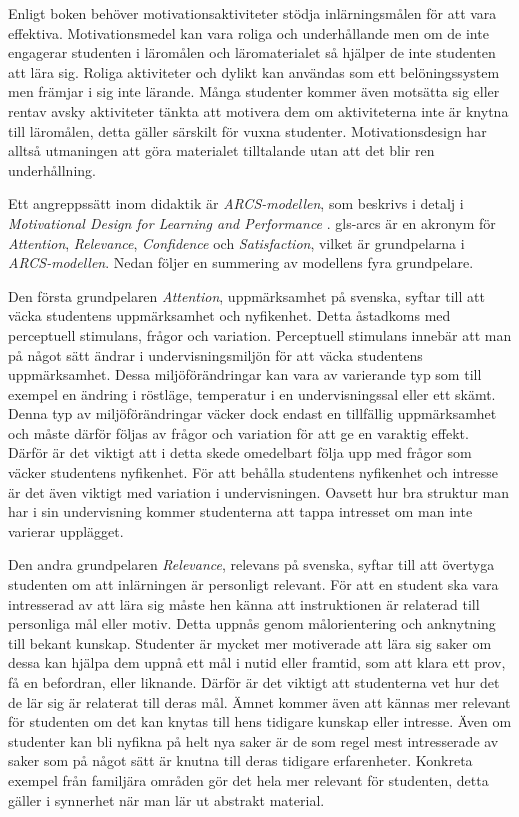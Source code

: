 \documentclass[12pt,a4paper,twoside,openright]{article}
\begin{document}
Enligt boken behöver motivations\-aktiviteter stödja inlärningsmålen
för att vara effektiva. Motivationsmedel kan vara roliga och
underhållande men om de inte engagerar studenten i läromålen och
läromaterialet så hjälper de inte studenten att lära sig. Roliga
aktiviteter och dylikt kan användas som ett belöningssystem men
främjar i sig inte lärande. Många studenter kommer även motsätta sig
eller rentav avsky aktiviteter tänkta att motivera dem om
aktiviteterna inte är knytna till läromålen, detta gäller särskilt för
vuxna studenter.  Motivationsdesign har alltså utmaningen att göra
materialet tilltalande utan att det blir ren underhållning.

Ett angreppssätt inom didaktik är \textit{ARCS-modellen}, som beskrivs
i detalj i \textit{Motivational Design for Learning and Performance}
\cite{motivational_design}. \gls{gls-arcs} är en akronym för
\textit{Attention}, \textit{Relevance}, \textit{Confidence} och
\textit{Satisfaction}, vilket är grundpelarna i
\textit{ARCS-modellen}. Nedan följer en summering av modellens fyra
grundpelare.

Den första grundpelaren \textit{Attention}, uppmärksamhet på svenska,
syftar till att väcka studentens uppmärksamhet och nyfikenhet. Detta
åstadkoms med perceptuell stimulans, frågor och variation.
Perceptuell stimulans innebär att man på något sätt ändrar i
undervisningsmiljön för att väcka studentens uppmärksamhet. Dessa
miljöförändringar kan vara av varierande typ som till exempel en
ändring i röstläge, temperatur i en undervisningssal eller ett skämt.
Denna typ av miljöförändringar väcker dock endast en tillfällig
uppmärksamhet och måste därför följas av frågor och variation för att
ge en varaktig effekt. Därför är det viktigt att i detta skede
omedelbart följa upp med frågor som väcker studentens nyfikenhet. För
att behålla studentens nyfikenhet och intresse är det även viktigt med
variation i undervisningen. Oavsett hur bra struktur man har i sin
undervisning kommer studenterna att tappa intresset om man inte
varierar upplägget.

Den andra grundpelaren \textit{Relevance}, relevans på svenska, syftar
till att övertyga studenten om att inlärningen är personligt relevant.
För att en student ska vara intresserad av att lära sig måste hen
känna att instruktionen är relaterad till personliga mål eller motiv.
Detta uppnås genom målorientering och anknytning till bekant kunskap.
Studenter är mycket mer motiverade att lära sig saker om dessa kan
hjälpa dem uppnå ett mål i nutid eller framtid, som att klara ett
prov, få en befordran, eller liknande. Därför är det viktigt att
studenterna vet hur det de lär sig är relaterat till deras mål. Ämnet
kommer även att kännas mer relevant för studenten om det kan knytas
till hens tidigare kunskap eller intresse. Även om studenter kan bli
nyfikna på helt nya saker är de som regel mest intresserade av saker
som på något sätt är knutna till deras tidigare erfarenheter.
Konkreta exempel från familjära områden gör det hela mer relevant för
studenten, detta gäller i synnerhet när man lär ut abstrakt material.
\end{document}
